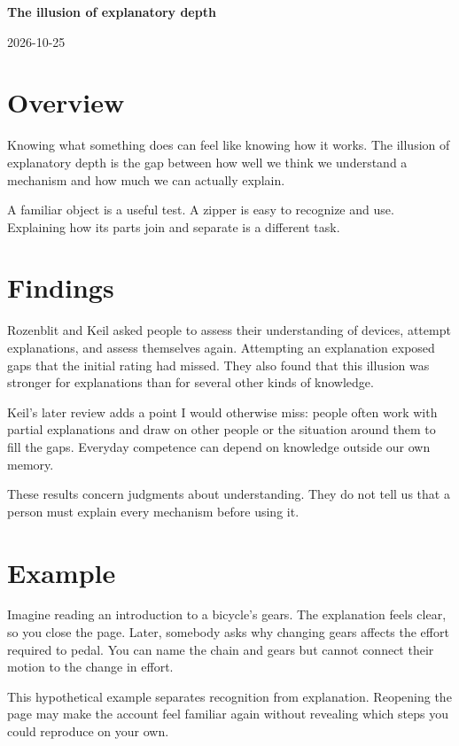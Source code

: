 \documentclass[11pt,a4paper]{article}
\newcommand{\researchtitle}{The illusion of explanatory depth}
\newcommand{\researchdate}{2026-10-25}
\begin{document}
{\LARGE\bfseries\researchtitle\par}
\vspace{0.4em}
{\small\researchdate\par}

\section{Overview}

Knowing what something does can feel like knowing how it works. The illusion
of explanatory depth is the gap between how well we think we understand
a mechanism and how much we can actually explain. \cite{rozenblit}

A familiar object is a useful test. A zipper is easy to recognize and use.
Explaining how its parts join and separate is a different task.

\section{Findings}

Rozenblit and Keil asked people to assess their understanding of devices,
attempt explanations, and assess themselves again. Attempting an explanation
exposed gaps that the initial rating had missed. They also found that this
illusion was stronger for explanations than for several other kinds of
knowledge. \cite{rozenblit}

Keil's later review adds a point I would otherwise miss: people often work
with partial explanations and draw on other people or the situation around
them to fill the gaps. Everyday competence can depend on knowledge outside
our own memory. \cite{keil}

These results concern judgments about understanding. They do not tell us
that a person must explain every mechanism before using it.

\section{Example}

Imagine reading an introduction to a bicycle's gears. The explanation feels
clear, so you close the page. Later, somebody asks why changing gears affects
the effort required to pedal. You can name the chain and gears but cannot
connect their motion to the change in effort.

This hypothetical example separates recognition from explanation. Reopening
the page may make the account feel familiar again without revealing which
steps you could reproduce on your own.
\end{document}
